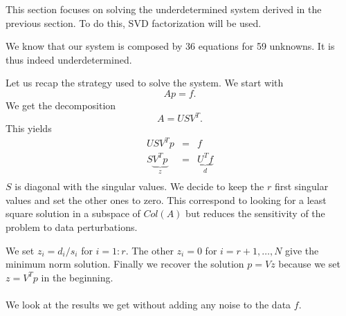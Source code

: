 This section focuses on solving the underdetermined system derived in the previous section. To do this, SVD factorization will be used. 

We know that our system is composed by 36 equations for 59 unknowns. It is thus indeed underdetermined. 

Let us recap the strategy used to solve the system. We start with $$Ap=f.$$
We get the decomposition $$A = USV^{T}.$$
This yields
\begin{eqnarray}
USV^{T}p & = & f\\
S\underbrace{V^{T }p}_{z} & = & \underbrace{U^{T}f}_{d}\\
\end{eqnarray}
$S$ is diagonal with the singular values. We decide to keep the $r$ first singular values and set the other ones to zero. This correspond to looking for a least square solution in a subspace of $Col(A)$ but reduces the sensitivity of the problem to data perturbations.


We set $z_{i}= d_{i}/s_{i}$ for $i = 1:r$. The other $z_{i}=0$ for $i = r+1,\dots,N$ give the minimum norm solution. Finally we recover the solution $p=Vz$ because we set $z=V^{T}p$ in the beginning.

\paragraph*{}
We look at the results we get without adding any noise to the data $f$.









